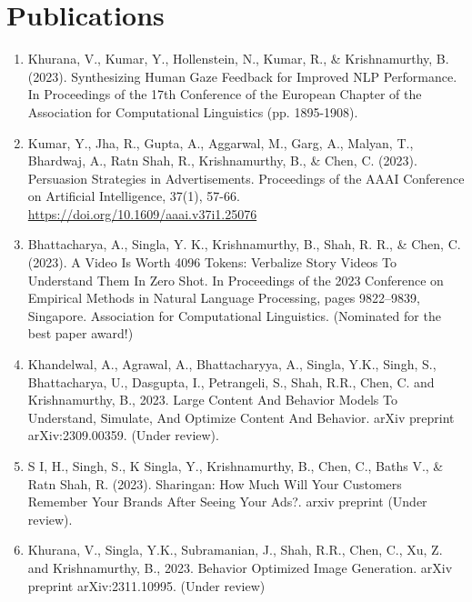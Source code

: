 \documentclass[hidelinks,11pt,a4paper]{report}
\begin{document}
\chapter*{Publications}
\begin{enumerate}
    \item Khurana, V., Kumar, Y., Hollenstein, N., Kumar, R., \& Krishnamurthy, B. (2023). Synthesizing Human Gaze Feedback for Improved NLP Performance. In Proceedings of the 17th Conference of the European Chapter of the Association for Computational Linguistics (pp. 1895-1908).
    
    \item Kumar, Y., Jha, R., Gupta, A., Aggarwal, M., Garg, A., Malyan, T., Bhardwaj, A., Ratn Shah, R., Krishnamurthy, B., \& Chen, C. (2023). Persuasion Strategies in Advertisements. Proceedings of the AAAI Conference on Artificial Intelligence, 37(1), 57-66. \url{https://doi.org/10.1609/aaai.v37i1.25076}

    \item Bhattacharya, A., Singla, Y. K., Krishnamurthy, B., Shah, R. R., \& Chen, C. (2023). A Video Is Worth 4096 Tokens: Verbalize Story Videos To Understand Them In Zero Shot. In Proceedings of the 2023 Conference on Empirical Methods in Natural Language Processing, pages 9822–9839, Singapore. Association for Computational Linguistics. (Nominated for the best paper award!)

    \item Khandelwal, A., Agrawal, A., Bhattacharyya, A., Singla, Y.K., Singh, S., Bhattacharya, U., Dasgupta, I., Petrangeli, S., Shah, R.R., Chen, C. and Krishnamurthy, B., 2023. Large Content And Behavior Models To Understand, Simulate, And Optimize Content And Behavior. arXiv preprint arXiv:2309.00359. (Under review). 

    \item  S I, H., Singh, S., K Singla, Y., Krishnamurthy, B., Chen, C., Baths V., \& Ratn Shah, R. (2023). Sharingan: How Much Will Your Customers Remember Your Brands After Seeing Your Ads?. arxiv preprint (Under review).

    \item Khurana, V., Singla, Y.K., Subramanian, J., Shah, R.R., Chen, C., Xu, Z. and Krishnamurthy, B., 2023. Behavior Optimized Image Generation. arXiv preprint arXiv:2311.10995. (Under review)

\end{enumerate}




\end{document}
